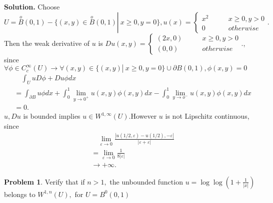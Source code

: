 \documentclass[a4paper]{book}
\newenvironment{solution}%
{\noindent\textbf{Solution.}}%
{\qedhere}
\numberwithin{equation}{chapter}
\theoremstyle{definition}
\newtheorem{problem}[exm]{Problem}
\begin{document}
\begin{solution}
  Choose $U = \overset{o}{B}(0,1) - \{(x,y) \in \overset{o}{B}(0,1)\left. \right|\ x \geq 0,y = 0 \}, u(x) =
  \begin{cases}
    x^2 \qquad &x \geq 0, y > 0 \\
    0         & otherwise
  \end{cases}.
  $ Then the weak derivative of $u$ is $Du(x,y) =
  \begin{cases}
    (2x,0)  \qquad &x \geq 0, y >0 \\
    (0,0)      &otherwise
  \end{cases}.
  $, since $\forall \phi \in C^\infty_c(U) \rightarrow \forall (x,y) \in \{(x,y) \left.\right|\ x \geq 0, y = 0 \} \cup \partial B(0,1), \phi(x,y) = 0$
  \begin{align*}
    &\quad\int_U u D\phi + Du \phi dx  \\
    &= \int_{\partial B} u \phi dx + \int_0^1 \lim_{y \rightarrow 0^+} u(x,y) \phi(x,y) dx - \int_0^1 \lim_{y\rightarrow o^-} u(x,y)\phi(x,y)dx \\
    &= 0.
  \end{align*}
  $u,Du$ is bounded implies $u \in W^{1,\infty}(U)$.However $u$ is not Lipschitz continuous, since
  \begin{align*}
    &\quad\lim_{\varepsilon \rightarrow 0}\frac{\left| u(1/2, \varepsilon) - u(1/2), -\varepsilon \right|}{\left| \varepsilon + \varepsilon \right|} \\
    &= \lim_{\varepsilon \rightarrow 0}\frac{1}{8\left| \varepsilon \right|} \\
    &\rightarrow +\infty.
  \end{align*}
\end{solution}

\begin{problem}
  Verify that if $n>1,$ the unbounded function $u=\log \log \left(1+\frac{1}{|x|}\right)$ belongs to $W^{1, n}(U),$ for $U=B^{0}(0,1)$
\end{problem}
\end{document}

